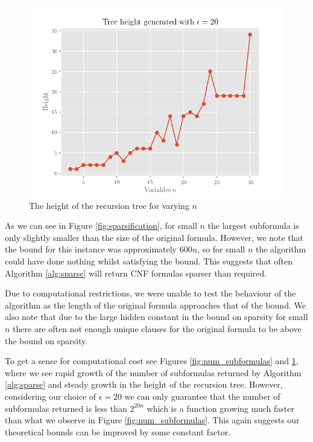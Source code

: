 \begin{figure}
    \centering
    \includegraphics[scale=0.7]{Chapter4/Figs/tree_height_20.png}
    \caption{The height of the recursion tree for varying $n$}
    \label{fig:tree_height}
\end{figure}

As we can see in Figure \ref{fig:sparsification}, for small $n$ the largest subformula
is only slightly smaller than the size of the original formula. However, we note that
the bound for this instance was approximately $600n$, so for small $n$ the algorithm
could have done nothing whilst satisfying the bound. This suggests that often
Algorithm \ref{alg:sparse} will return CNF formulas sparser than required.

Due to computational restrictions, we were unable to test the behaviour of the algorithm
as the length of the original formula approaches that of the bound. We also note that
due to the large hidden constant in the bound on sparsity for small $n$ there are often
not enough unique clauses for the original formula to be above the bound on sparsity.

To get a sense for computational cost see Figures \ref{fig:num_subformulas} and \ref{fig:tree_height},
where we see rapid growth of the number of subformulas returned by Algorithm \ref{alg:sparse} and steady
growth in the height of the recursion tree. However, considering our choice of $\epsilon = 20$ we can
only guarantee that the number of subformulas returned is less than $2^{20n}$ which is a function growing much faster
than what we observe in Figure \ref{fig:num_subformulas}. This again suggests our theoretical bounds can be improved by
some constant factor.

